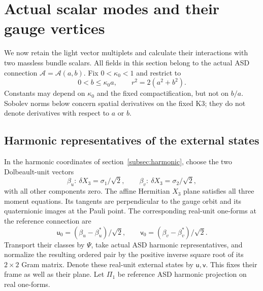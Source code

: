 \section{Actual scalar modes and their gauge vertices}\label{sec:modes}

We now retain the light vector multiplets and calculate their interactions
with two massless bundle scalars. All fields in this section belong to the
actual ASD connection $\mathcal A=\mathcal A(a,b)$. Fix $0<\kappa_0<1$
and restrict to
\begin{equation}\label{eq:hierarchycone}
 0<b\le\kappa_0a,\qquad r^2=2(a^2+b^2).
\end{equation}
Constants may depend on $\kappa_0$ and the fixed compactification, but not
on $b/a$. Sobolev norms below concern spatial derivatives on the fixed K3;
they do not denote derivatives with respect to $a$ or $b$.

\subsection{Harmonic representatives of the external states}
In the harmonic coordinates of section~\ref{subsec:harmonic}, choose the
two Dolbeault-unit vectors
\begin{equation}\label{eq:plane}
 \beta_u:\ \delta X_3=\sigma_1/\sqrt2,\qquad
 \beta_v:\ \delta X_3=\sigma_2/\sqrt2,
\end{equation}
with all other components zero. The affine Hermitian $X_3$ plane satisfies
all three moment equations. Its tangents are perpendicular to the gauge
orbit and its quaternionic images at the Pauli point. The corresponding
real-unit one-forms at the reference connection are
\begin{equation}\label{eq:realstates}
 \mathsf u_0=(\beta_u-\beta_u^*)/\sqrt2,\qquad
 \mathsf v_0=(\beta_v-\beta_v^*)/\sqrt2.
\end{equation}
Transport their classes by $\Psi$, take actual ASD harmonic representatives,
and normalize the resulting ordered pair by the positive inverse square
root of its $2\times2$ Gram matrix. Denote these real-unit external states
by $\mathsf u,\mathsf v$. This fixes their frame as well as their plane.
Let $\Pi_1$ be reference ASD harmonic projection on real one-forms.


